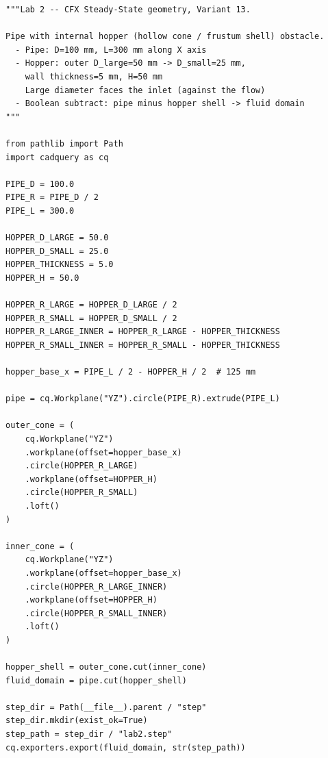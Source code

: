 \begin{lstlisting}[style=python]
"""Lab 2 -- CFX Steady-State geometry, Variant 13.

Pipe with internal hopper (hollow cone / frustum shell) obstacle.
  - Pipe: D=100 mm, L=300 mm along X axis
  - Hopper: outer D_large=50 mm -> D_small=25 mm,
    wall thickness=5 mm, H=50 mm
    Large diameter faces the inlet (against the flow)
  - Boolean subtract: pipe minus hopper shell -> fluid domain
"""

from pathlib import Path
import cadquery as cq

PIPE_D = 100.0
PIPE_R = PIPE_D / 2
PIPE_L = 300.0

HOPPER_D_LARGE = 50.0
HOPPER_D_SMALL = 25.0
HOPPER_THICKNESS = 5.0
HOPPER_H = 50.0

HOPPER_R_LARGE = HOPPER_D_LARGE / 2
HOPPER_R_SMALL = HOPPER_D_SMALL / 2
HOPPER_R_LARGE_INNER = HOPPER_R_LARGE - HOPPER_THICKNESS
HOPPER_R_SMALL_INNER = HOPPER_R_SMALL - HOPPER_THICKNESS

hopper_base_x = PIPE_L / 2 - HOPPER_H / 2  # 125 mm

pipe = cq.Workplane("YZ").circle(PIPE_R).extrude(PIPE_L)

outer_cone = (
    cq.Workplane("YZ")
    .workplane(offset=hopper_base_x)
    .circle(HOPPER_R_LARGE)
    .workplane(offset=HOPPER_H)
    .circle(HOPPER_R_SMALL)
    .loft()
)

inner_cone = (
    cq.Workplane("YZ")
    .workplane(offset=hopper_base_x)
    .circle(HOPPER_R_LARGE_INNER)
    .workplane(offset=HOPPER_H)
    .circle(HOPPER_R_SMALL_INNER)
    .loft()
)

hopper_shell = outer_cone.cut(inner_cone)
fluid_domain = pipe.cut(hopper_shell)

step_dir = Path(__file__).parent / "step"
step_dir.mkdir(exist_ok=True)
step_path = step_dir / "lab2.step"
cq.exporters.export(fluid_domain, str(step_path))
\end{lstlisting}


